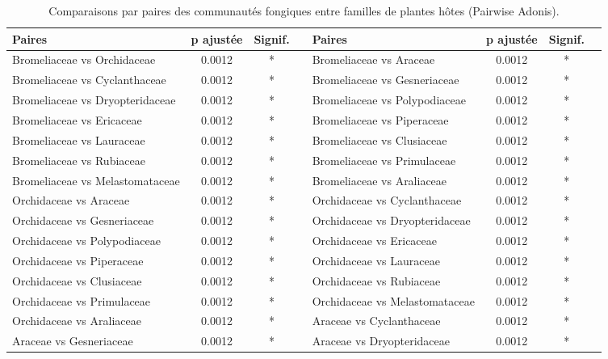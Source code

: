 \documentclass[a4paper,12pt]{article}
\begin{document}
\begin{table}[H]
    \centering
    \caption{Comparaisons par paires des communautés fongiques entre familles de plantes hôtes (Pairwise Adonis).}
    \label{tab:permanova_pairwise_familles}
    \renewcommand{\arraystretch}{1.1}
    \setlength{\tabcolsep}{3pt}
    \scriptsize
    \begin{tabular}{lccc|lccc}
        \hline
        \textbf{Paires} & \textbf{p ajustée} & \textbf{Signif.} & & \textbf{Paires} & \textbf{p ajustée} & \textbf{Signif.} \\
        \hline
        Bromeliaceae vs Orchidaceae & 0.0012 & * & & Bromeliaceae vs Araceae & 0.0012 & * \\
        Bromeliaceae vs Cyclanthaceae & 0.0012 & * & & Bromeliaceae vs Gesneriaceae & 0.0012 & * \\
        Bromeliaceae vs Dryopteridaceae & 0.0012 & * & & Bromeliaceae vs Polypodiaceae & 0.0012 & * \\
        Bromeliaceae vs Ericaceae & 0.0012 & * & & Bromeliaceae vs Piperaceae & 0.0012 & * \\
        Bromeliaceae vs Lauraceae & 0.0012 & * & & Bromeliaceae vs Clusiaceae & 0.0012 & * \\
        Bromeliaceae vs Rubiaceae & 0.0012 & * & & Bromeliaceae vs Primulaceae & 0.0012 & * \\
        Bromeliaceae vs Melastomataceae & 0.0012 & * & & Bromeliaceae vs Araliaceae & 0.0012 & * \\
        Orchidaceae vs Araceae & 0.0012 & * & & Orchidaceae vs Cyclanthaceae & 0.0012 & * \\
        Orchidaceae vs Gesneriaceae & 0.0012 & * & & Orchidaceae vs Dryopteridaceae & 0.0012 & * \\
        Orchidaceae vs Polypodiaceae & 0.0012 & * & & Orchidaceae vs Ericaceae & 0.0012 & * \\
        Orchidaceae vs Piperaceae & 0.0012 & * & & Orchidaceae vs Lauraceae & 0.0012 & * \\
        Orchidaceae vs Clusiaceae & 0.0012 & * & & Orchidaceae vs Rubiaceae & 0.0012 & * \\
        Orchidaceae vs Primulaceae & 0.0012 & * & & Orchidaceae vs Melastomataceae & 0.0012 & * \\
        Orchidaceae vs Araliaceae & 0.0012 & * & & Araceae vs Cyclanthaceae & 0.0012 & * \\
        Araceae vs Gesneriaceae & 0.0012 & * & & Araceae vs Dryopteridaceae & 0.0012 & * \\

\end{tabular}
\end{table}
\end{document}
